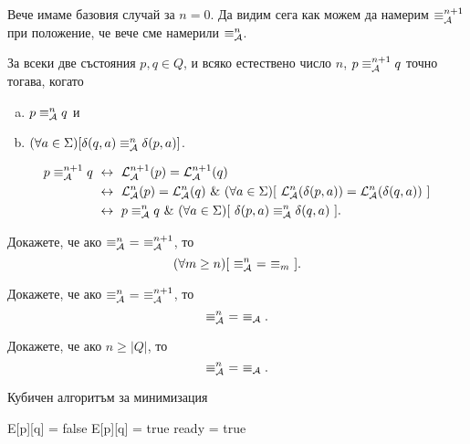 Вече имаме базовия случай за $n=0$.
Да видим сега как можем да намерим $\equiv^{n+1}_{\mathcal{A}}$ при положение, че вече сме намерили $\equiv^n_{\mathcal{A}}$.
\begin{framed}
  \begin{proposition}
    \label{pr:one-letter-test}
    За всеки две състояния $p,q \in Q$, и всяко естествено число $n$, $p \equiv^{n+1}_{\mathcal{A}} q$ точно тогава, когато
    \begin{enumerate}[a)]
    \item
      $p \equiv^n_{\mathcal{A}} q$ и
    \item
      $(\forall a \in \Sigma)[\delta(q,a) \equiv^n_{\mathcal{A}} \delta(p,a)]$.
    \end{enumerate}
  \end{proposition}  
\end{framed}
\begin{hint}
  \begin{align*}
    p \equiv^{n+1}_\A q & \iff \L^{n+1}_\A(p) = \L^{n+1}_\A(q)\\
                     & \iff \L^n_\A(p) = \L^n_\A(q)\ \&\ (\forall a \in \Sigma)[\ \L^n_\A(\delta(p,a)) = \L^n_\A(\delta(q,a))\ ]\\
                     & \iff p \equiv^n_\A q\ \&\ (\forall a \in \Sigma)[\ \delta(p,a) \equiv^n_\A \delta(q,a)\ ].
  \end{align*}
\end{hint}

\begin{problem}
  Докажете, че ако $\equiv^n_\A\ =\ \equiv^{n+1}_\A$, то
  \[(\forall m \geq n)[\ \equiv^n_{\mathcal{A}}\ =\ \equiv_m\ ].\]
\end{problem}

\begin{problem}
  Докажете, че ако $\equiv^n_\A\ =\ \equiv^{n+1}_\A$, то
  \[\equiv^n_\A\ =\ \equiv_\A.\]
\end{problem}

\begin{problem}
  Докажете, че ако $n \geq |Q|$, то
  \[\equiv^n_\A\ =\ \equiv_\A.\]
\end{problem}


\begin{algorithm}[H]
  \caption{Кубичен алгоритъм за минимизация}
  \label{alg:minimisation-cube}
  \begin{algorithmic}[1]
    \State E[p][q] = false 
    \Else
    \State E[p][q] = true 
    \EndIf
    \EndFor
    \EndFor
    \Repeat
    \State ready = true
      
    \EndIf
    \EndFor
    \EndIf
    \EndFor
    \EndFor
  \end{algorithmic}
\end{algorithm}

